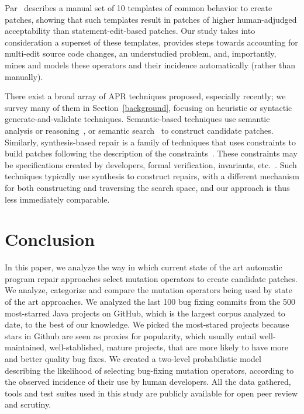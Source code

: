 \documentclass[conference]{IEEEtran}
\begin{document}
Par~\cite{kim2013} describes a manual set of 10 templates of common behavior to
create patches, showing that such templates result in patches of higher
human-adjudged acceptability than statement-edit-based patches.  Our study takes 
into consideration a superset
of these templates, provides steps towards
accounting for multi-edit source code changes, an understudied problem, and,
importantly, mines and models these operators and their incidence automatically
(rather than manually).

There exist a broad array of APR techniques proposed, especially recently; we
survey many of them in Section~\ref{background}, focusing on heuristic or
syntactic generate-and-validate techniques.  Semantic-based techniques use
semantic analysis or reasoning~\cite{nguyen13,mechtaev15,Mechtaev2016,Bach17S3}, or
semantic search~\cite{ke15} to construct candidate patches.  Similarly,
synthesis-based repair is a family of techniques that uses constraints to build
patches following the description of the constraints~\cite{jin11,wei10}. These constraints may be
specifications created by developers, formal verification, invariants,
etc.~\cite{jin11,wei10}.  Such techniques typically use synthesis to construct
repairs, with a different mechanism for both constructing and traversing the
search space, and our approach is thus less immediately comparable.
 

\section{Conclusion} \label{conclusion}

In this paper, we analyze the way in which current state of the art automatic 
program repair approaches select mutation operators to create candidate 
patches. We analyze, categorize and compare the mutation operators being used by 
state of the art approaches. We analyzed the last 100 bug fixing commits from 
the
500 most-starred Java projects on GitHub, which is the largest corpus analyzed
to date, to the best of our knowledge. We picked the most-stared projects because stars in Github are seen as proxies for popularity, which usually entail well-maintained, well-stablished, mature projects, that are more likely to have more and better quality bug fixes. We created a two-level probabilistic 
model describing
the likelihood of selecting bug-fixing mutation operators, according to the
observed incidence of their use by human developers. All the data gathered, 
tools and test suites used in this study are publicly available for open peer review 
and scrutiny.
\end{document}
